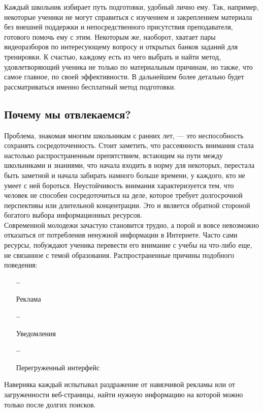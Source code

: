 \documentclass[a4paper, 12pt]{extarticle}
\begin{document}
Каждый школьник избирает путь подготовки, удобный лично ему. Так, например,
некоторые ученики не могут справиться с изучением и закреплением материала без
внешней поддержки и непосредственного присутствия преподавателя, готового помочь
ему с этим. Некоторым же, наоборот, хватает пары видеоразборов по
интересующему вопросу и открытых банков заданий для тренировки. К счастью,
каждому есть из чего выбрать и найти метод, удовлетворяющий ученика не только
по материальным причинам, но также, что самое главное, по своей эффективности.
В дальнейшем более детально будет рассматриваться именно бесплатный метод
подготовки.
\newpage

\subsection{Почему мы отвлекаемся?}
Проблема, знакомая многим школьникам с ранних лет, — это неспособность
сохранять сосредоточенность. Стоит заметить, что рассеянность внимания
стала настолько распространенным препятствием, встающим на пути между
школьниками и знаниями, что начала входить в норму для некоторых, перестала
быть заметной и начала забирать намного больше времени, у каждого, кто не умеет
с ней бороться. Неустойчивость внимания характеризуется тем, что человек не способен
сосредоточиться на деле, которое требует долгосрочной перспективы или
длительной концентрации. Это и является обратной стороной богатого выбора
информационных ресурсов.
\\

Современной молодежи зачастую становится трудно, а порой и вовсе невозможно
отказаться от потребления ненужной информации в Интернете. Часто сами ресурсы,
побуждают ученика перевести его внимание с учебы на что-либо еще, не связанное
с темой образования. Распространенные причины подобного поведения:
\begin{itemize}
    \item[\bfseries--] {\small Реклама\par}
    \item[\bfseries--] {\small Уведомления\par}
    \item[\bfseries--] {\small Перегруженный интерфейс\par}
\end{itemize}
Наверняка каждый испытывал раздражение от навязчивой рекламы или от
загруженности веб-страницы, найти нужную информацию на которой можно только
после долгих поисков.
\\
\end{document}
